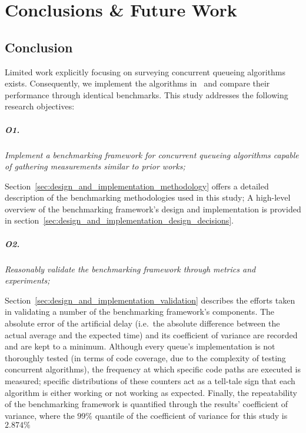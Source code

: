 \chapter{Conclusions \& Future Work}
\section{Conclusion}
Limited work explicitly focusing on surveying concurrent
queueing algorithms exists. Consequently, we implement the algorithms
in~\citep{michael1996simple,hoffman2007baskets,valois1994queues} and compare
their performance through identical benchmarks. This study addresses the following research
objectives:

\paragraph{O1.} \emph{Implement a benchmarking framework for concurrent
queueing algorithms capable of gathering measurements similar to prior works;}

Section~\ref{sec:design_and_implementation_methodology} offers a detailed
description of the benchmarking methodologies used in this study; A high-level
overview of the benchmarking framework's design and implementation is provided in
section~\ref{sec:design_and_implementation_design_decisions}.

\paragraph{O2.} \emph{Reasonably validate the benchmarking framework through
metrics and experiments;}

Section~\ref{sec:design_and_implementation_validation} describes the efforts
taken in validating a number of the benchmarking framework's components.
The absolute error of the artificial delay (i.e.~the absolute difference
between the actual average and the expected time) and its coefficient of
variance are recorded and are kept to a minimum.
Although every queue's implementation is not thoroughly tested (in terms of
code coverage, due to the
complexity of testing concurrent algorithms), the frequency at which specific code
paths are executed is measured; specific distributions of these counters act as
a tell-tale sign that each algorithm is either working or not working as
expected. Finally, the repeatability of the benchmarking framework is
quantified through the results' coefficient of variance, where the $99\%$
quantile of the coefficient of variance for this study is $2.874\%$

